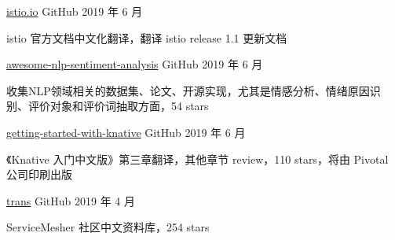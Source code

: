 

\begin{cventries}

  \cventry
    {} %
    {\href{https://github.com/istio/istio.io}{istio.io}} %
    {GitHub} %
    {2019 年 6 月} %
    {
      \begin{cvitems} %
        \item istio 官方文档中文化翻译，翻译 istio release 1.1 更新文档
      \end{cvitems}
    }

  \cventry
    {} %
    {\href{haiker2011/awesome-nlp-sentiment-analysis}{awesome-nlp-sentiment-analysis}} %
    {GitHub} %
    {2019 年 6 月} %
    {
      \begin{cvitems} %
        \item 收集NLP领域相关的数据集、论文、开源实现，尤其是情感分析、情绪原因识别、评价对象和评价词抽取方面，54 stars
      \end{cvitems}
    }

  \cventry
    {} %
    {\href{https://github.com/servicemesher/getting-started-with-knative}{getting-started-with-knative}} %
    {GitHub} %
    {2019 年 6 月} %
    {
      \begin{cvitems} %
        \item 《Knative 入门中文版》第三章翻译，其他章节 review，110 stars，将由 Pivotal 公司印刷出版
      \end{cvitems}
    }

  \cventry
    {} %
    {\href{https://github.com/servicemesher/trans}{trans}} %
    {GitHub} %
    {2019 年 4 月} %
    {
      \begin{cvitems} %
        \item ServiceMesher 社区中文资料库，254 stars
      \end{cvitems}
    }



\end{cventries}
